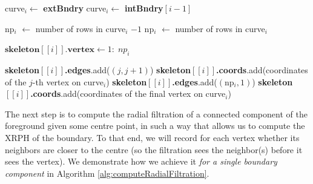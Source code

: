 \documentclass[a4paper,11pt]{article}
\theoremstyle{definition}
\begin{document}
\begin{algorithm}[H]
\begin{algorithmic}
        \State curve$_i \gets $ \textbf{extBndry} 
    \Else
        \State curve$_i \gets $ \textbf{intBndry}$[i-1]$
    \EndIf
    
    
    \State np$_i$ $\gets $ number of rows in curve$_i$ $- 1$
    \Else
    \State np$_i$ $\gets $ number of rows in curve$_i$
    \EndIf
    
    \State $\textbf{skeleton$[[i]]$.vertex} \gets 1:\;np_i$
    
        \State \textbf{skeleton$[[i]]$.edges}.add($(j,j+1)$)
        \State \textbf{skeleton$[[i]]$.coords}.add(coordinates of the $j$-th vertex on curve$_i$)
    \EndFor
    \State \textbf{skeleton$[[i]]$.edges}.add($(\text{np$_i$},1)$)
    \State \textbf{skeleton$[[i]]$.coords}.add(coordinates of the final vertex on curve$_i$)
\EndFor
\end{algorithmic}
\end{algorithm}

The next step is to compute the radial filtration of a connected component of the foreground given some centre point, in such a way that allows us to compute the XRPH of the boundary. To that end, we will record for each vertex whether its neighbors are closer to the centre (so the filtration sees the neighbor(s) before it sees the vertex). We demonstrate how we achieve it \emph{for a single boundary component} in Algorithm \ref{alg:computeRadialFiltration}. 
\end{document}
